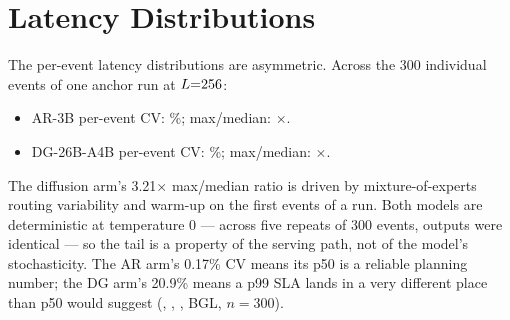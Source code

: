 \section{Latency Distributions}
\label{app:distributions}

The per-event latency distributions are asymmetric. Across the 300 individual
events of one anchor run at $L{=}256$:
\begin{itemize}[nosep]
\item AR-3B per-event CV: \arEventCV\%; max/median: \arMaxMed$\times$.
\item DG-26B-A4B per-event CV: \dgEventCV\%; max/median: \dgMaxMed$\times$.
\end{itemize}
The diffusion arm's 3.21$\times$ max/median ratio is driven by
mixture-of-experts routing variability and warm-up on the first events of a
run. Both models are deterministic at temperature 0 --- across five repeats of
300 events, outputs were identical --- so the tail is a property of the
serving path, not of the model's stochasticity. The AR arm's 0.17\% CV means
its p50 is a reliable planning number; the DG arm's 20.9\% means a p99 SLA
lands in a very different place than p50 would suggest
(,
,
, BGL, $n{=}300$).

